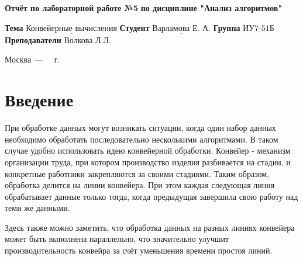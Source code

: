 \documentclass[12pt]{report}
\begin{document}
\begin{titlepage}
	
	\begin{center}
		\noindent\begin{minipage}{1.3\textwidth}\centering
			\Large\textbf{  Отчёт по лабораторной работе №5}\newline
			\textbf{по дисциплине "Анализ алгоритмов"}\newline\newline
		\end{minipage}
	\end{center}
	
	\noindent\textbf{Тема} $\underline{\text{Конвейерные вычисления}}$\newline\newline
	\noindent\textbf{Студент} $\underline{\text{Варламова Е. А.}}$\newline\newline
	\noindent\textbf{Группа} $\underline{\text{ИУ7-51Б}}$\newline\newline
	\noindent\textbf{Преподаватели} $\underline{\text{Волкова Л.Л.}}$\newline\newline\newline
	
	\begin{center}
		\vfill
		Москва~---~\the\year
		~г.
	\end{center}
\end{titlepage}

\setcounter{page}{2}
\tableofcontents

\newpage
\chapter*{Введение}

При обработке данных могут возникать ситуации, когда один набор данных необходимо обработать последовательно несколькими алгоритмами. В таком случае удобно использовать идею конвейерной обработки. Конвейер - механизм организации труда, при котором производство изделия разбивается на стадии, и конкретные работники закрепляются за своими стадиями. Таким образом, обработка делится на линии конвейера. При этом каждая следующая линия обрабатывает данные только тогда, когда предыдущая завершила свою работу над теми же данными. 

Здесь также можно заметить, что обработка данных на разных линиях конвейера может быть выполнена параллельно, что значительно улучшит производительность конвейра за счёт уменьшения времени простоя линий.
\end{document}
